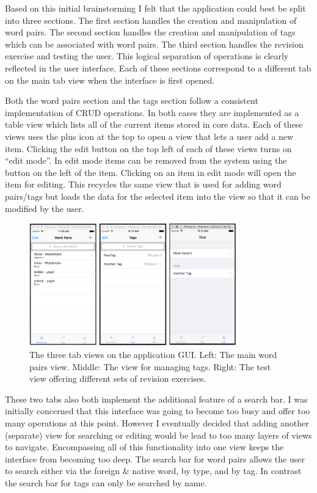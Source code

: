\documentclass[paper=a4, fontsize=11pt]{scrartcl}	%
\numberwithin{equation}{section}															%
\numberwithin{figure}{section}																%
\numberwithin{table}{section}
\begin{document}
Based on this initial brainstorming I felt that the application could best be split into three sections. The first section handles the creation and manipulation of word pairs. The second section handles the creation and manipulation of tags which can be associated with word pairs. The third section handles the revision exercise and testing the user. This logical separation of operations is clearly reflected in the user interface. Each of these sections correspond to a different tab on the main tab view when the interface is first opened.

Both the word pairs section and the tags section follow a consistent implementation of CRUD operations. In both cases they are implemented as a table view which lists all of the current items stored in core data. Each of these views uses the plus icon at the top to open a view that lets a user add a new item. Clicking the edit button on the top left of each of these views turns on ``edit mode''. In edit mode items can be removed from the system using the button on the left of the item. Clicking on an item in edit mode will open the item for editing. This recycles the same view that is used for adding word pairs/tags but loads the data for the selected item into the view so that it can be modified by the user.

\begin{figure}[H]
\centering
\includegraphics[width=0.8\textwidth]{img/views.jpg}
\caption{The three tab views on the application GUI. Left: The main word pairs view. Middle: The view for managing tags. Right: The test view offering different sets of revision exercises.}
\label{fig:views}
\end{figure}

These two tabs also both implement the additional feature of a search bar. I was initially concerned that this interface was going to become too busy and offer too many operations at this point. However I eventually decided that adding another (separate) view for searching or editing would be lead to too many layers of views to navigate. Encompassing all of this functionality into one view keeps the interface from becoming too deep. The search bar for word pairs allows the user to search either via the foreign \& native word, by type, and by tag. In contrast the search bar for tags can only be searched by name. 
\end{document}
